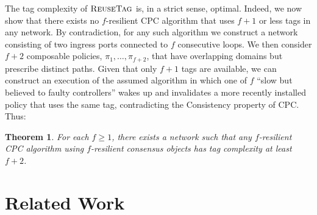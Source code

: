 \documentclass[11pt,pdftex,letter]{article}
\newcommand{\DPO}{\textsc{ReuseTag}}
\newcommand{\eg}{{\it e.g.}}
\newtheorem{theorem}{Theorem}
\begin{document}
The tag complexity of $\DPO$ is, in a strict sense, optimal.
Indeed, we now show that there exists no $f$-resilient CPC algorithm that uses
$f+1$ or less tags in any network.
By contradiction, for any such algorithm we construct a
network consisting of two ingress ports connected to $f$ consecutive
loops.
We then consider $f+2$ composable policies, $\pi_1,\ldots,\pi_{f+2}$,
that have overlapping domains but prescribe distinct paths.
%
Given that only $f+1$ tags are available, we can construct an
execution of the assumed algorithm in which one of $f$ ``slow but believed to faulty controllers'' wakes up 
and invalidates a more recently installed policy that uses the same
tag, contradicting the Consistency property of CPC.
Thus:

\begin{theorem}\label{th:tagbound}
For each $f\geq 1$, there exists a network such that
any $f$-resilient CPC algorithm using %
$f$-resilient consensus objects
has tag complexity at least $f+2$.
\end{theorem}



\section{Related Work}\label{sec:related}

%
%



\end{document}
